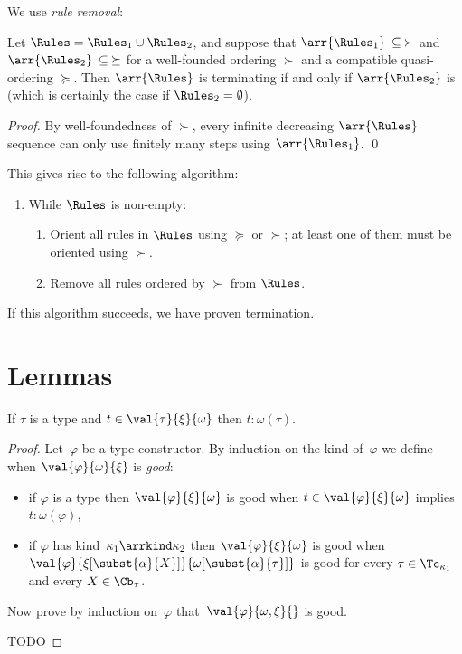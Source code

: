 \renewcommand{\theenumii}{\alph{enumii}}

We use \emph{rule removal}:

\begin{theorem}\label{thm:ruleremove}
Let $\Rules = \Rules_1 \cup \Rules_2$, and suppose that $\arr{\Rules_1}\:
\subseteq\:\succ$ and $\arr{\Rules_2}\:\subseteq\:\succeq$ for a
well-founded ordering $\succ$ and a compatible quasi-ordering $\succeq$.
Then $\arr{\Rules}$ is terminating if and only if $\arr{\Rules_2}$ is
(which is certainly the case if $\Rules_2 = \emptyset$).
\end{theorem}

\begin{proof}
By well-foundedness of $\succ$, every infinite decreasing $\arr{\Rules}$
sequence can only use finitely many steps using $\arr{\Rules_1}$.
\qed
\end{proof}

This gives rise to the following algorithm:
\begin{enumerate}
\item While $\Rules$ is non-empty:
  \begin{enumerate}
  \item Orient all rules in $\Rules$ using $\succeq$ or $\succ$; at least
    one of them must be oriented using $\succ$.
  \item Remove all rules ordered by $\succ$ from $\Rules$.
  \end{enumerate}
\end{enumerate}
If this algorithm succeeds, we have proven termination.

\section{Lemmas}

\begin{lemma}\label{lem_reducible_type}
  If $\tau$ is a type and $t \in \val{\tau}{\xi}{\omega}$ then
  $t : \omega(\tau)$.
\end{lemma}

\begin{proof}
  Let~$\varphi$ be a type constructor. By induction on the kind
  of~$\varphi$ we define when $\val{\varphi}{\omega}{\xi}$ is
  \emph{good}:
  \begin{itemize}
  \item if $\varphi$ is a type then $\val{\varphi}{\xi}{\omega}$ is
    good when $t \in \val{\varphi}{\xi}{\omega}$ implies
    $t : \omega(\varphi)$,
  \item if $\varphi$ has kind~$\kappa_1\arrkind\kappa_2$ then
    $\val{\varphi}{\xi}{\omega}$ is good when
    $\val{\varphi}{\xi[\subst{\alpha}{X}]}{\omega[\subst{\alpha}{\tau}]}$
    is good for every $\tau \in \Tc_{\kappa_1}$ and every
    $X \in \Cb_\tau$.
  \end{itemize}
  Now prove by induction on~$\varphi$
  that~$\val{\varphi}{\omega,\xi}{}$ is good.

  TODO
\end{proof}

